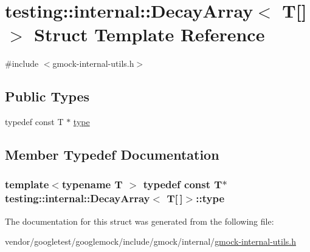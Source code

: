 \hypertarget{structtesting_1_1internal_1_1DecayArray_3_01T[]_4}{}\section{testing\+:\+:internal\+:\+:Decay\+Array$<$ T\mbox{[}\mbox{]}$>$ Struct Template Reference}
\label{structtesting_1_1internal_1_1DecayArray_3_01T[]_4}


{\ttfamily \#include $<$gmock-\/internal-\/utils.\+h$>$}

\subsection*{Public Types}
\begin{DoxyCompactItemize}
\item 
typedef const T $\ast$ \hyperlink{structtesting_1_1internal_1_1DecayArray_3_01T[]_4_a1820b673d104b3a985faaef8db5d77d2}{type}
\end{DoxyCompactItemize}


\subsection{Member Typedef Documentation}
\subsubsection[{\texorpdfstring{type}{type}}]{\setlength{\rightskip}{0pt plus 5cm}template$<$typename T $>$ typedef const T$\ast$ {\bf testing\+::internal\+::\+Decay\+Array}$<$ T\mbox{[}$\,$\mbox{]}$>$\+::{\bf type}}\hypertarget{structtesting_1_1internal_1_1DecayArray_3_01T[]_4_a1820b673d104b3a985faaef8db5d77d2}{}\label{structtesting_1_1internal_1_1DecayArray_3_01T[]_4_a1820b673d104b3a985faaef8db5d77d2}


The documentation for this struct was generated from the following file\+:\begin{DoxyCompactItemize}
\item 
vendor/googletest/googlemock/include/gmock/internal/\hyperlink{gmock-internal-utils_8h}{gmock-\/internal-\/utils.\+h}\end{DoxyCompactItemize}
